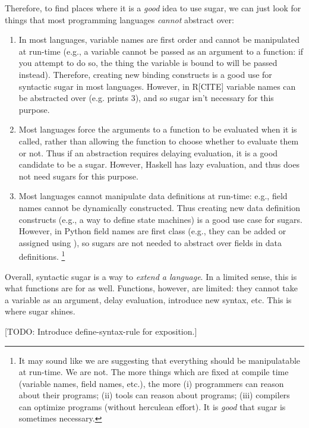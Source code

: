 Therefore, to find places where it is a \emph{good} idea to use sugar,
we can just look for things that most programming languages
\emph{cannot} abstract over:
\begin{enumerate}
  \item In most languages, variable names are first order and cannot
    be manipulated at run-time (e.g., a variable cannot be passed as
    an argument to a function: if you attempt to do so, the thing the
    variable is bound to will be passed instead). Therefore, creating
    new binding constructs is a good use for syntactic sugar in most
    languages. However, in R[CITE] variable names can be abstracted
    over (e.g.  prints 3), and so sugar isn't
    necessary for this purpose.
  \item Most languages force the arguments to a function to be
    evaluated when it is called, rather than allowing the function to
    choose whether to
    evaluate them or not. Thus if an abstraction requires delaying
    evaluation, it is a good candidate to be a sugar. However, Haskell
    has lazy evaluation, and thus does not need sugars for this purpose.
  \item Most languages cannot manipulate data definitions at run-time:
    e.g., field names cannot be dynamically constructed. Thus creating
    new data definition constructs (e.g., a way to define state
    machines) is a good use case for sugars. However, in Python field
    names are first class (e.g., they can be added or assigned using
    ), so sugars are not needed to abstract over fields
    in data definitions.
    \footnote{
    It may sound like we are suggesting that everything should be
    manipulatable at run-time. We are not. The more
    things which are fixed at compile time (variable names, field
    names, etc.), the more (i) programmers can reason about their
    programs; (ii) tools can reason about programs; (iii) compilers
    can optimize programs (without herculean effort). It is
    \emph{good} that sugar is sometimes necessary.
  }
\end{enumerate}

Overall, syntactic sugar is a way to \emph{extend a language}.
In a limited sense, this is what functions are for as well.
Functions, however, are limited: they cannot take a variable as an
argument, delay evaluation, introduce new syntax, etc. This is where
sugar shines.

[TODO: Introduce define-syntax-rule for exposition.]
